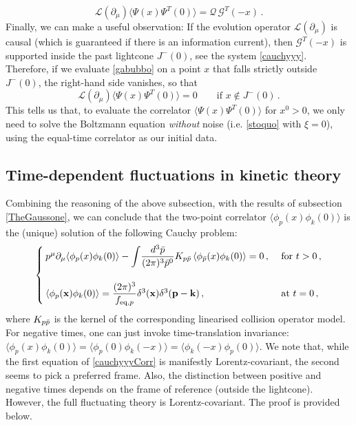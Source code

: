 \documentclass[aps,prd,preprint,nofootinbib,amsmath,amssymb,showpacs,longbibliography,singlecolumn,superscriptaddress,10pt]{revtex4-1}
\theoremstyle{plain}
\theoremstyle{definition}
\begin{document}
\begin{equation}\label{gabubbo}
\mathcal{L}(\partial_\mu) \langle \Psi(x)\Psi^T(0)\rangle =  \mathcal{Q} \, \mathcal{G}^T(-x) \, .  
\end{equation}
Finally, we can make a useful observation: If the evolution operator $\mathcal{L}(\partial_\mu)$ is causal (which is guaranteed if there is an information current), then $\mathcal{G}^T(-x)$ is supported inside the past lightcone $J^-(0)$, see the system \eqref{cauchyyy}. Therefore, if we evaluate \eqref{gabubbo} on a point $x$ that falls strictly outside $J^-(0)$, the right-hand side vanishes, so that
\begin{equation}\label{thirtyseven}
    \mathcal{L}(\partial_\mu) \langle \Psi(x)\Psi^T(0)\rangle =0  \quad \quad \text{if }x \notin J^-(0) \, .
\end{equation}
This tells us that, to evaluate the correlator $\langle \Psi(x)\Psi^T(0)\rangle$ for $x^0>0$, we only need to solve the Boltzmann equation \textit{without} noise (i.e. \eqref{stoquo} with $\xi=0$), using the equal-time correlator as our initial data.


\subsection{Time-dependent fluctuations in kinetic theory}\label{conniunzo}


Combining the reasoning of the above subsection, with the results of subsection \ref{TheGaussone}, we can conclude that the two-point correlator $\langle \phi_p(x)\phi_k(0) \rangle$ is the (unique) solution of the following Cauchy problem:
\begin{equation}\label{cauchyyyCorr}
   \begin{cases}
    p^\mu \partial_\mu \langle \phi_p(x)\phi_k(0) \rangle-{\displaystyle \int} \dfrac{d^3 \Bar{p}}{(2\pi)^3 \Bar{p}^0} K_{p\Bar{p}} \,  \langle \phi_{\Bar{p}}(x)\phi_k(0) \rangle=0 \, , & \text{ for }t>0 \, , \\
    \\
    \langle \phi_p(\textbf{x})\phi_k(0) \rangle= \dfrac{(2\pi)^3}{f_{\text{eq},p}} \delta^3(\textbf{x})\delta^3(\textbf{p}-\textbf{k}) \, , & \text{ at }t=0 \, ,
  \end{cases}  
\end{equation}
where $K_{p\Bar{p}}$ is the kernel of the corresponding linearised collision operator model. For negative times, one can just invoke time-translation invariance: $\langle \phi_p(x)\phi_k(0) \rangle=\langle \phi_p(0)\phi_k(-x) \rangle=\langle \phi_k(-x)\phi_p(0) \rangle$. We note that, while the first equation of \eqref{cauchyyyCorr} is manifestly Lorentz-covariant, the second seems to pick a preferred frame. Also, the distinction between positive and negative times depends on the frame of reference (outside the lightcone). However, the full fluctuating theory is Lorentz-covariant. The proof is provided below.
\end{document}
